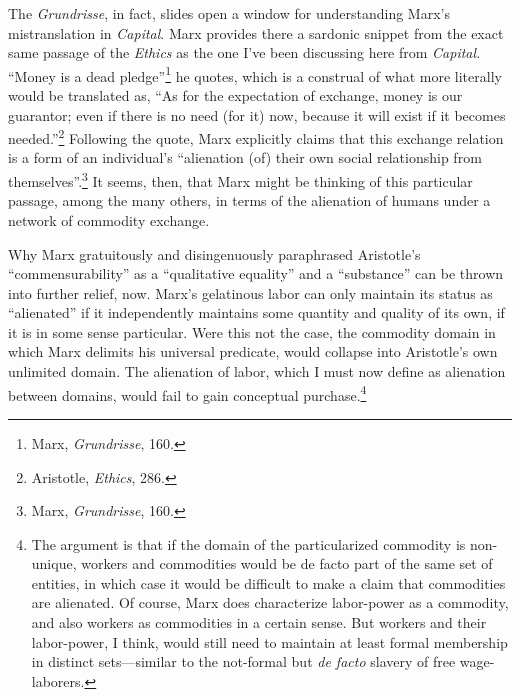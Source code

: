 \documentclass[12pt]{article}
\begin{document}
The \textit{Grundrisse}, in fact, slides open a window for understanding Marx's mistranslation in \textit{Capital}. Marx provides there a sardonic snippet from the exact same passage of the \textit{Ethics} as the one I've been discussing here from \textit{Capital}. ``Money is a dead pledge''\footnote{Marx, \textit{Grundrisse}, 160.} he quotes, which is a construal of what more literally would be translated as, ``As for the expectation of exchange, money is our guarantor; even if there is no need (for it) now, because it will exist if it becomes needed.''\footnote{Aristotle, \textit{Ethics}, 286.} Following the quote, Marx explicitly claims that this exchange relation is a form of an individual's ``alienation (of) their own social relationship from themselves''.\footnote{Marx, \textit{Grundrisse}, 160.} It seems, then, that Marx might be thinking of this particular passage, among the many others, in terms of the alienation of humans under a network of commodity exchange.  

Why Marx gratuitously and disingenuously paraphrased Aristotle's ``commensurability'' as a ``qualitative equality'' and a ``substance'' can be thrown into further relief, now. Marx's gelatinous labor can only maintain its status as ``alienated'' if it independently maintains some quantity and quality of its own, if it is in some sense particular. Were this not the case, the commodity domain in which Marx delimits his universal predicate, would collapse into Aristotle's own unlimited domain. The alienation of labor, which I must now define as alienation between domains, would fail to gain conceptual purchase.\footnote{The argument is that if the domain of the particularized commodity is non-unique, workers and commodities would be de facto part of the same set of entities, in which case it would be difficult to make a claim that commodities are alienated. Of course, Marx does characterize labor-power as a commodity, and also workers as commodities in a certain sense. But workers and their labor-power, I think, would still need to maintain at least formal membership in distinct sets---similar to the not-formal but \textit{de facto} slavery of free wage-laborers.}  
\end{document}
